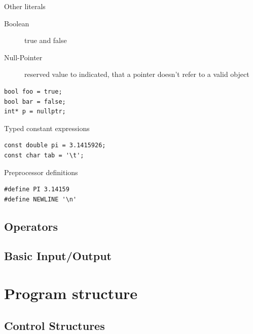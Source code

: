\documentclass{beamer}
\begin{document}
\begin{frame}[fragile]{Other literals}
\begin{description}
\item[Boolean] true and false
\item[Null-Pointer] reserved value to indicated, that a pointer doesn't refer to
a valid object
\end{description}
\begin{lstlisting}[caption=Other literals]
bool foo = true;
bool bar = false;
int* p = nullptr;
\end{lstlisting}
\end{frame}


\begin{frame}[fragile]{Typed constant expressions}
\begin{lstlisting}[caption=Typed constant expressions]
const double pi = 3.1415926;
const char tab = '\t';
\end{lstlisting}
\end{frame}

\begin{frame}[fragile]{Preprocessor definitions}
\begin{lstlisting}[caption=Preprocessor definitions]
#define PI 3.14159
#define NEWLINE '\n'
\end{lstlisting}

\end{frame}


\subsection{Operators}
\subsection{Basic Input/Output}

\section{Program structure}
\subsection{Control Structures}
\begin{frame}

\end{frame}
\end{document}
